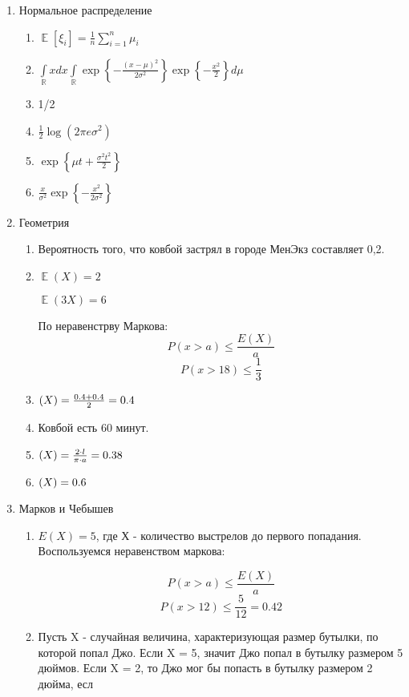 \documentclass[11pt, a4paper]{article}
\DeclareMathOperator{\E}{\mathbb{E}}
\let\P\relax
\DeclareMathOperator{\P}{\mathbb{P}}
\def \R{\mathbb{R}}
\renewcommand{\leq}{\leqslant}
\theoremstyle{definition}
\begin{document}
\begin{enumerate}
    \item Нормальное распределение 
\begin{enumerate}
    \item $\E [\xi_i]=\frac{1}{n}\sum\limits_{i=1}^n \mu_i$ 
    \item $\int\limits_{\R} xdx \int\limits_{\R} \exp\left\{- \frac{(x-\mu)^2}{2\sigma^2} \right\} \exp\left\{- \frac{x^2}{2}\right\} d\mu$
    \item 1/2
    \item $\frac{1}{2} \log(2\pi e\sigma^2)$
    \item $\exp \left\{\mu t+\frac{\sigma^2t^2}{2} \right\}$
    \item $\frac{x}{\sigma^2} \exp\left\{-\frac{x^2}{2\sigma^2} \right\}$
\end{enumerate}  
    
    \item Геометрия

\begin{enumerate}
    \item Вероятность того, что ковбой застрял в городе МенЭкз составляет 0,2.
    \item $\E(X) = 2$
    
    $\E(3X) = 6$
    
    По неравенстрву Маркова:
    \[
    P(x > a) \leq \frac{E(X)}{a}
    \]
    \[
    P(x > 18) \leq \frac{1}{3}
    \]
    \item $\P(X)= \frac{0.4 + 0.4}{2} = 0.4 $
    \item Ковбой есть 60 минут.
    \item $\P(X)= \frac{2 \cdot l}{\pi \cdot a} = 0.38 $
    \item $\P(X) = 0.6$
\end{enumerate}    

    \item Марков и Чебышев

\begin{enumerate}
    \item  $E(X) = 5$, где Х - количество выстрелов до первого попадания. 
    Воспользуемся неравенством маркова:
    
    \[
    P(x > a) \leq \frac{E(X)}{a}
    \]
    \[
    P(x > 12) \leq \frac{5}{12} = 0.42
    \]

    \item 
    Пусть X - случайная величина, характеризующая размер бутылки, по которой попал Джо. Если X = 5, значит Джо попал в бутылку размером 5 дюймов. Если X = 2, то Джо мог бы попасть в бутылку размером 2 дюйма, есл
    \[
    \]
    

\end{enumerate}
\end{enumerate}
\end{document}
